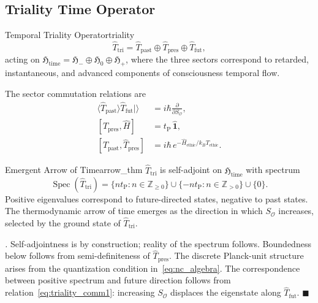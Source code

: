 \documentclass[12pt,a4paper]{article}
\theoremstyle{myrmk}
\renewenvironment{proof}[1][\proofname]{%
  \par\noindent\textit{#1.}\enspace\ignorespaces}{\hfill$\blacksquare$\par\medskip}
\newcommand{\Hethic}{\hat{H}_{\mathrm{ethic}}}
\newcommand{\tP}{t_{\mathrm{P}}}
\newcommand{\Spec}{\operatorname{Spec}}
\newcommand{\ket}[1]{|#1\rangle}
\begin{document}
\subsection{Triality Time Operator}

\begin{definition}{Temporal Triality Operator}{triality}
\begin{equation}
  \hat{T}_{\mathrm{tri}} = \hat{T}_{\mathrm{past}}\oplus\hat{T}_{\mathrm{pres}}\oplus\hat{T}_{\mathrm{fut}},
  \label{eq:triality_op}
\end{equation}
acting on $\mathfrak{H}_{\mathrm{time}}=\mathfrak{H}_-\oplus\mathfrak{H}_0\oplus\mathfrak{H}_+$,
where the three sectors correspond to retarded, instantaneous, and advanced
components of consciousness temporal flow.
\end{definition}

The sector commutation relations are
\begin{align}
  \langle\hat{T}_{\mathrm{past}}\rangle\hat{T}_{\mathrm{fut}}\ket{} &= i\hbar\frac{\partial}{\partial S_{\mathcal{O}}},
  \label{eq:triality_comm1}\\
  [\hat{T}_{\mathrm{pres}},\hat{H}] &= \tP\,\hat{\mathbf{1}},
  \label{eq:triality_comm2}\\
  [\hat{T}_{\mathrm{past}},\hat{T}_{\mathrm{pres}}] &= i\hbar\,e^{-\Hethic/k_BT_{\mathrm{ethic}}}.
  \label{eq:triality_comm3}
\end{align}

\begin{theorem}{Emergent Arrow of Time}{arrow_thm}
$\hat{T}_{\mathrm{tri}}$ is self-adjoint on $\mathfrak{H}_{\mathrm{time}}$ with spectrum
\begin{equation}
  \Spec(\hat{T}_{\mathrm{tri}})
  = \{n\tP : n\in\mathbb{Z}_{\geq0}\}
    \cup\{-n\tP : n\in\mathbb{Z}_{>0}\}
    \cup\{0\}.
  \label{eq:triality_spectrum}
\end{equation}
Positive eigenvalues correspond to future-directed states, negative to past states.
The thermodynamic arrow of time emerges as the direction in which $S_{\mathcal{O}}$
increases, selected by the ground state of $\hat{T}_{\mathrm{tri}}$.
\end{theorem}

\begin{proof}
Self-adjointness is by construction; reality of the spectrum follows. Boundedness below
follows from semi-definiteness of $\hat{T}_{\mathrm{pres}}$. The discrete Planck-unit
structure arises from the quantization condition in~\eqref{eq:nc_algebra}.
The correspondence between positive spectrum and future direction follows from
relation~\eqref{eq:triality_comm1}: increasing $S_{\mathcal{O}}$ displaces the
eigenstate along $\hat{T}_{\mathrm{fut}}$.
\end{proof}
\end{document}
